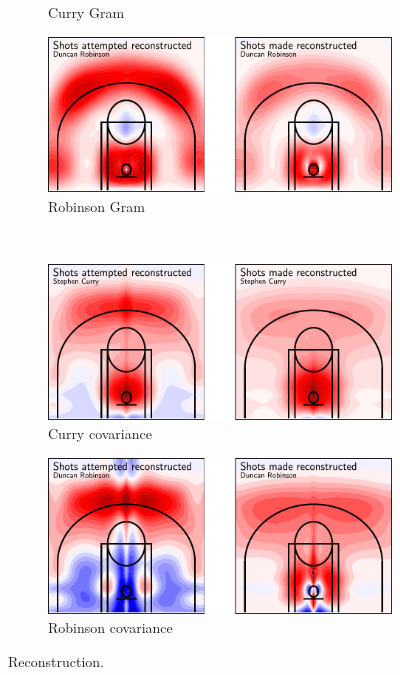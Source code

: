 \begin{figure}
\begin{subfigure}[b]{0.45\textwidth}
        \caption{Curry Gram}
        \label{fig:curry_gram}
    \end{subfigure}
    \hfill
    \begin{subfigure}[b]{0.45\textwidth}
        \centering
        \includegraphics[width=\textwidth]{figures/robinson_gram.pdf}
        \caption{Robinson Gram}
        \label{fig:robinson_gram}
    \end{subfigure}
    \\
    \begin{subfigure}[b]{0.45\textwidth}
        \centering
        \includegraphics[width=\textwidth]{figures/curry_covariance.pdf}
        \caption{Curry covariance}
        \label{fig:curry_covariance}
    \end{subfigure}
    \hfill
    \begin{subfigure}[b]{0.45\textwidth}
        \centering
        \includegraphics[width=\textwidth]{figures/robinson_covariance.pdf}
        \caption{Robinson covariance}
        \label{fig:robinson_covariance}
    \end{subfigure}
    \caption{Reconstruction.}
    \label{fig:reconstruction}
\end{figure}
